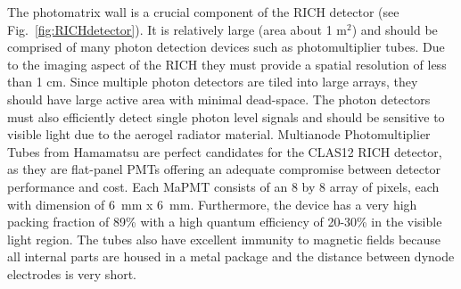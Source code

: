 The photomatrix  wall is a crucial component of the RICH detector (see Fig.~\ref{fig:RICHdetector}). It is relatively large (area about 1 m$^2$) and should be comprised of many photon detection devices such as photomultiplier tubes.
Due to the imaging aspect of the RICH they must provide a spatial resolution of less than 1 cm.
Since multiple photon detectors are tiled into large arrays, they should have large active area with minimal dead-space.
The photon detectors must also efficiently detect single photon level signals and should be sensitive to visible light due to the aerogel radiator material.
Multianode Photomultiplier Tubes from Hamamatsu are perfect candidates for the CLAS12 RICH detector, as they are flat-panel PMTs offering an adequate compromise between detector performance and cost.
Each MaPMT consists of an 8 by 8 array of pixels, each with dimension of 6~mm x 6~mm.
Furthermore, the device has a very high packing fraction of 89\% with a high quantum efficiency of 20-30\% in the visible light region.
The tubes also have excellent immunity to magnetic fields because all internal parts are housed in a metal package and the distance between dynode electrodes is very short.


